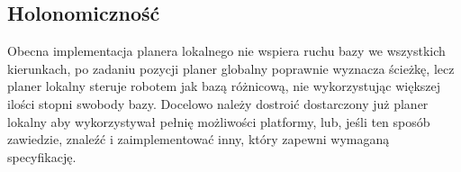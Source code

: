 \subsection{Holonomiczność}

	Obecna implementacja planera lokalnego nie wspiera ruchu bazy we wszystkich kierunkach, po zadaniu pozycji planer globalny poprawnie wyznacza ścieżkę, lecz planer lokalny steruje robotem jak bazą różnicową, nie wykorzystując większej ilości stopni swobody bazy. 
	Docelowo należy dostroić dostarczony już planer lokalny aby wykorzystywał pełnię możliwości platformy, lub, jeśli ten sposób zawiedzie, znaleźć i zaimplementować inny, który zapewni wymaganą specyfikację.